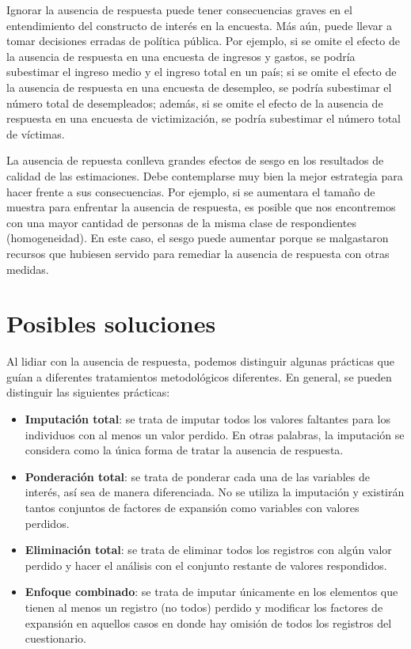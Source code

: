 \documentclass[
  12pt,
  spanish,
]{book}
\providecommand{\tightlist}{%
  \setlength{\itemsep}{0pt}\setlength{\parskip}{0pt}}
\begin{document}
Ignorar la ausencia de respuesta puede tener consecuencias graves en el entendimiento del constructo de interés en la encuesta. Más aún, puede llevar a tomar decisiones erradas de política pública. Por ejemplo, si se omite el efecto de la ausencia de respuesta en una encuesta de ingresos y gastos, se podría subestimar el ingreso medio y el ingreso total en un país; si se omite el efecto de la ausencia de respuesta en una encuesta de desempleo, se podría subestimar el número total de desempleados; además, si se omite el efecto de la ausencia de respuesta en una encuesta de victimización, se podría subestimar el número total de víctimas.

La ausencia de repuesta conlleva grandes efectos de sesgo en los resultados de calidad de las estimaciones. Debe contemplarse muy bien la mejor estrategia para hacer frente a sus consecuencias. Por ejemplo, si se aumentara el tamaño de muestra para enfrentar la ausencia de respuesta, es posible que nos encontremos con una mayor cantidad de personas de la misma clase de respondientes (homogeneidad). En este caso, el sesgo puede aumentar porque se malgastaron recursos que hubiesen servido para remediar la ausencia de respuesta con otras medidas.

\hypertarget{posibles-soluciones}{%
\section{Posibles soluciones}\label{posibles-soluciones}}

Al lidiar con la ausencia de respuesta, podemos distinguir algunas prácticas que guían a diferentes tratamientos metodológicos diferentes. En general, se pueden distinguir las siguientes prácticas:

\begin{itemize}
\tightlist
\item
  \textbf{Imputación total}: se trata de imputar todos los valores faltantes para los individuos con al menos un valor perdido. En otras palabras, la imputación se considera como la única forma de tratar la ausencia de respuesta.
\item
  \textbf{Ponderación total}: se trata de ponderar cada una de las variables de interés, así sea de manera diferenciada. No se utiliza la imputación y existirán tantos conjuntos de factores de expansión como variables con valores perdidos.
\item
  \textbf{Eliminación total}: se trata de eliminar todos los registros con algún valor perdido y hacer el análisis con el conjunto restante de valores respondidos.
\item
  \textbf{Enfoque combinado}: se trata de imputar únicamente en los elementos que tienen al menos un registro (no todos) perdido y modificar los factores de expansión en aquellos casos en donde hay omisión de todos los registros del cuestionario.
\end{itemize}
\end{document}
